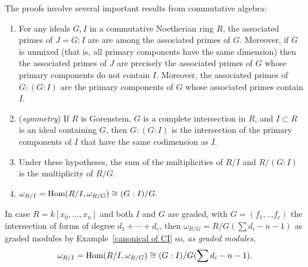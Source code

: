  The proofs involve several important results from commutative algebra:
 
\begin{theorem} \label{double colon}
\begin{enumerate}
\item For any ideals $G,I$ in a commutative Noetherian ring $R$, the associated primes of  $J = G:I$ are  are among the associated primes of $G$. Moreover, if $G$ is unmixed (that is, all primary components have the same dimension) then  
the associated primes of $J$ are precisely the associated primes of $G$ whose primary components do not contain $I$.
Moreover, the associated primes of $G:(G:I)$ are the primary components of $G$ whose associated primes contain $I$.

\item (\emph{symmetry}) If $R$ is Gorenstein, $G$ is a complete intersection in $R$, and $I\subset R$ is an ideal containing $G$, then $G:(G:I)$ is the 
intersection of the primary components of $I$ that have the same codimension as $I$. 

\item Under these hypotheses, the sum of the multiplicities of $R/I$ and $R/(G:I)$ is the multiplicity of $R/G$.

\item 
$
\omega_{R/I} = \operatorname{Hom}(R/I, \omega_{R/G})\cong (G:I)/G.
$\\
\end{enumerate}
\end{theorem}

In case $R = k[x_{0},\dots,x_{n}]$ and both $I$ and $G$ are graded, with $G = (f_{1}, \dots f_{c})$ the intersection of forms of degree
$d_{1}+\cdots + d_{c}$, then $\omega_{R/G} = R/G(\sum d_{i} -n-1)$ as graded modules by Example~\ref{canonical of CI} so, \emph{as graded modules},
$$
\omega_{R/I} = \operatorname{Hom}(R/I, \omega_{R/G})\cong (G:I)/G(\sum d_{i} -n-1).
$$



